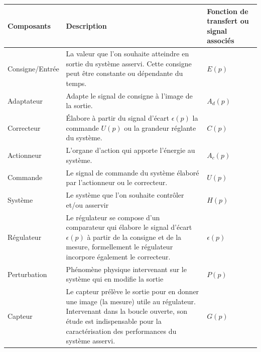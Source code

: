 \begin{table}[!h]
    \centering
    \begin{tabular}{@{}P{3cm}m{8.5cm}P{3cm}@{}}
    \toprule
Composants      & Description & Fonction de transfert ou signal associés\\
    \midrule
Consigne/Entrée & La valeur que l'on souhaite atteindre en sortie 
                  du système asservi. Cette consigne peut être constante 
                  ou dépendante du temps. 
                & $E(p)$                                                \\
Adaptateur      & Adapte le signal de consigne à l'image de la sortie.
                & $A_d(p)$                                              \\
Correcteur      & \'Elabore à partir du signal d'écart $\epsilon(p)$ 
                  la commande $U(p)$ ou la grandeur réglante du système.
                & $C(p)$                                                \\
Actionneur      & L'organe d'action qui apporte l'énergie au système.
                & $A_c(p)$                                              \\
Commande        & Le signal de commande du système élaboré par l'actionneur 
		                  ou le correcteur.
                & $U(p)$                                                \\
Système         & Le système que l'on souhaite contrôler et/ou asservir
                & $H(p)$                                                \\
Régulateur      & Le régulateur se compose d'un comparateur qui élabore le 
                  signal d'écart $\epsilon(p)$ à partir de la consigne et de 
                  la mesure, formellement le régulateur incorpore 
                  également le correcteur.
                & $\epsilon(p)$                                         \\
Perturbation    & Phénomène physique intervenant sur le système qui 
                  en modifie la sortie
                & $P(p)$                                                \\
Capteur         &  Le capteur prélève le sortie pour en donner une 
                   image (la mesure) utile au régulateur. 
                   Intervenant dans la boucle ouverte, son étude 
                   est indispensable pour la caractérisation des 
                   performances du système asservi.
                & $G(p)$                                                \\

\end{tabular}
\end{table}
